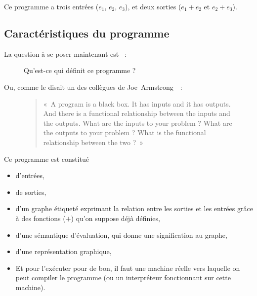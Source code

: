\documentclass{article}
\begin{document}
Ce programme a trois entrées ($e_1$, $e_2$, $e_3$), et deux sorties ($e_1+e_2$ et $e_2+e_3$).

\subsection{Caractéristiques du programme}
La question à se poser maintenant est ~:
\begin{figure}[h!]
  \centering
  Qu'est-ce qui définit ce programme ?
\end{figure}

Ou, comme le disait un des collègues de Joe~Armstrong~\cite{what-inputs}~:

\begin{figure}[h!]
  \centering
  \begin{quotation}
    «~A program is a black box. It has inputs and it has outputs. And there is a functional relationship between the inputs and the outputs. What are the inputs to your problem ? What are the outputs to your problem ? What is the functional relationship between the two ?~»
  \end{quotation}
\end{figure}

%

Ce programme est constitué
\begin{itemize}
\item d'entrées,
\item de sorties,
\item d'un graphe étiqueté exprimant la relation entre les sorties et les entrées grâce à des fonctions ($+$) qu'on suppose déjà définies,
\item d'une sémantique d'évaluation, qui donne une signification au graphe,
\item d'une représentation graphique,
\item Et pour l'exécuter pour de bon, il faut une machine réelle vers laquelle on peut compiler le programme (ou un interpréteur fonctionnant sur cette machine).
\end{itemize}
\end{document}
